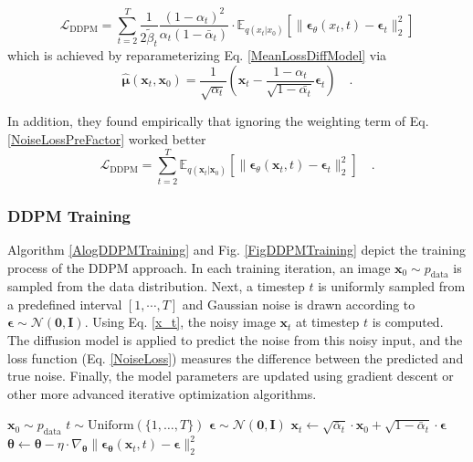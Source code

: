 \begin{equation}
    \mathcal{L}_{\text{DDPM}}  = \sum_{t=2}^T\frac{1}{2\tilde{\beta}_t} \frac{(1 - \alpha_t)^2}{\alpha_t(1 - \bar{\alpha}_t)} \cdot \mathbb{E}_{q(x_t|x_0)} \left[ \|\boldsymbol{\epsilon}_\theta(x_t, t) - \boldsymbol{\epsilon}_t\|_2^2 \right] 
    \label{NoiseLossPreFactor}
\end{equation}
which is achieved by reparameterizing Eq. \ref{MeanLossDiffModel} via 
\begin{equation}
    \boldsymbol{\hat{\mu}}(\mathbf{x}_t, \mathbf{x}_0) = \frac{1}{\sqrt{\alpha_t}} \left( \mathbf{x}_t - \frac{1-\alpha_t}{\sqrt{1-\bar{\alpha_t}}}\boldsymbol{\epsilon}_t  \right) \quad.
\end{equation}


In addition, they found empirically that ignoring the weighting term of Eq. \ref{NoiseLossPreFactor} worked better
\begin{equation}
    \mathcal{L}_{\text{DDPM}}  = \sum_{t=2}^T \mathbb{E}_{q(\mathbf{x}_t|\mathbf{x}_0)} \left[ \|\boldsymbol{\epsilon}_\theta(\mathbf{x}_t, t) - \boldsymbol{\epsilon}_t\|_2^2 \right] 
    \label{NoiseLoss} \quad.
\end{equation}


\subsubsection{DDPM Training}  Algorithm \ref{AlogDDPMTraining} and Fig. \ref{FigDDPMTraining} depict the training process of the DDPM approach. In each training iteration, an image $\mathbf{x}_0 \sim p_\text{data}$ is sampled from the data distribution. Next, a timestep $t$ is uniformly sampled from a predefined interval $[1,\cdots,T]$ and Gaussian noise is drawn according to $\boldsymbol{\epsilon} \sim \mathcal{N}(\mathbf{0}, \mathbf{I})$. Using Eq. \ref{x_t}, the noisy image $\mathbf{x}_t$ at timestep $t$ is computed. The diffusion model is applied to predict the noise from this noisy input, and the loss function (Eq.  \ref{NoiseLoss}) measures the difference between the predicted and true noise. Finally, the model parameters are updated using gradient descent or other more advanced iterative optimization algorithms. \\



\begin{algorithm}
\caption{Training of \gls{DDPM} using learning rate $\eta$ \cite{LectureNotesDDPM}}
\begin{algorithmic}
\Repeat
\State $\mathbf{x}_0 \sim p_{\text{data}}$
\State $t \sim \text{Uniform}(\{1, \ldots, T\})$
\State $\boldsymbol{\epsilon} \sim \mathcal{N}(\mathbf{0}, \mathbf{I})$
\State $\mathbf{x}_t \leftarrow \sqrt{\bar{\alpha}_t} \cdot \mathbf{x}_0 + \sqrt{1 - \bar{\alpha}_t} \cdot \boldsymbol{\epsilon}$
\State $\boldsymbol{\theta} \leftarrow \boldsymbol{\theta} - \eta \cdot \nabla_{\boldsymbol{\theta}} \|\boldsymbol{\epsilon}_{\boldsymbol{\theta}}(\mathbf{x}_t, t) - \boldsymbol{\epsilon}\|_2^2$
\end{algorithmic}
\label{AlogDDPMTraining}
\end{algorithm}

